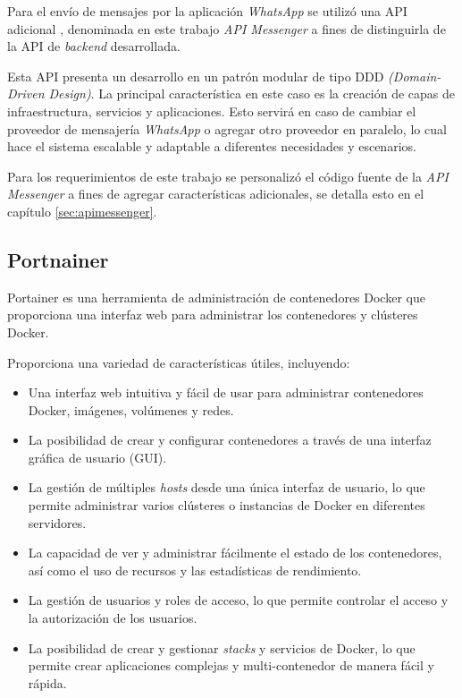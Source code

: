 Para el envío de mensajes por la aplicación \textit{WhatsApp} \cite{whatsapp} se utilizó una API adicional \cite{api-whatsapp-ts}, denominada en este trabajo \textit{API Messenger} a fines de distinguirla de la API de \textit{backend} desarrollada.

Esta API presenta un desarrollo en un patrón modular de tipo DDD \textit{(Domain-Driven Design)}. La principal característica en este caso es la creación de capas de infraestructura, servicios y aplicaciones. Esto servirá en caso de cambiar el proveedor de mensajería \textit{WhatsApp} o agregar otro proveedor en paralelo, lo cual hace el sistema escalable y adaptable a diferentes necesidades y escenarios.

Para los requerimientos de este trabajo se personalizó el código fuente de la \textit{API Messenger} a fines de agregar características adicionales, se detalla esto en el capítulo \ref{sec:apimessenger}.

\subsection{Portnainer}
\label{subsec:portainer}

Portainer \citep{PortainerDocs} es una herramienta de administración de contenedores Docker \cite{WEBSITE:docker} que proporciona una interfaz web para administrar los contenedores y clústeres Docker. 

Proporciona una variedad de características útiles, incluyendo:

\begin{itemize}
\item Una interfaz web intuitiva y fácil de usar para administrar contenedores Docker, imágenes, volúmenes y redes.
\item La posibilidad de crear y configurar contenedores a través de una interfaz gráfica de usuario (GUI).
\item La gestión de múltiples \textit{hosts} desde una única interfaz de usuario, lo que permite administrar varios clústeres o instancias de Docker en diferentes servidores.
\item La capacidad de ver y administrar fácilmente el estado de los contenedores, así como el uso de recursos y las estadísticas de rendimiento.
\item La gestión de usuarios y roles de acceso, lo que permite controlar el acceso y la autorización de los usuarios.
\item La posibilidad de crear y gestionar \textit{stacks} y servicios de Docker, lo que permite crear aplicaciones complejas y multi-contenedor de manera fácil y rápida.
\end{itemize}

